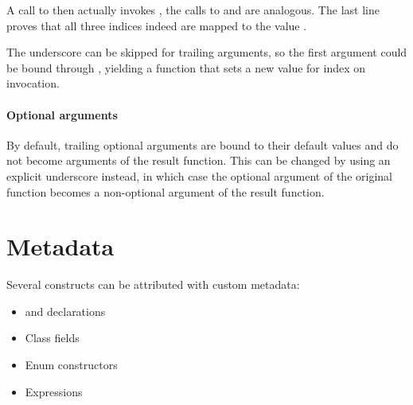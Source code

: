 A call to  then actually invokes , the calls to  and  are analogous. The last line proves that all three indices indeed are mapped to the value .

The underscore \expr{_} can be skipped for trailing arguments, so the first argument could be bound through , yielding a  function that sets a new value for index  on invocation.

\paragraph{Optional arguments}

By default, trailing optional arguments are bound to their default values and do not become arguments of the result function. This can be changed by using an explicit underscore \expr{_} instead, in which case the optional argument of the original function becomes a non-optional argument of the result function.




\section{Metadata}
\label{lf-metadata}

Several constructs can be attributed with custom metadata:

\begin{itemize}
	\item {} and  declarations
	\item Class fields
	\item Enum constructors
	\item Expressions
\end{itemize}

